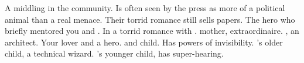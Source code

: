 \documentclass[char]{LRSguildcamp1}
\begin{document}
\begin{contacts}
	\contact{\cOldest{}} A middling \cOldest{\villain} in the community. Is often seen by the press as more of a political animal than a real menace. Their torrid romance still sells papers. 
	\contact{\cOS{}} The hero who briefly mentored you and \cJuggernaut{}. In a torrid romance with \cOldest{}. 
	\contact{\cGrandma{}} \cYoungest{} mother, \cGrandma{\MYsupername} \cGrandma{\villain} extraordinaire.  
	\contact{\cArchitect{}} \cYoungest{} \cYoungest{\sibling}, an architect. 
	\contact{\cYoungest{}} Your lover and a hero. 
	\contact{\cGrad{}}  \cOldest{\MYsupername} and \cOS{\MYsupername} child. Has powers of invisibility.  
	\contact{\cTeen{}} \cArchitect{}'s older child, a technical wizard.
	\contact{\cTween{}} \cArchitect{}'s younger child, has super-hearing.  
	
\end{contacts}
\end{document}
